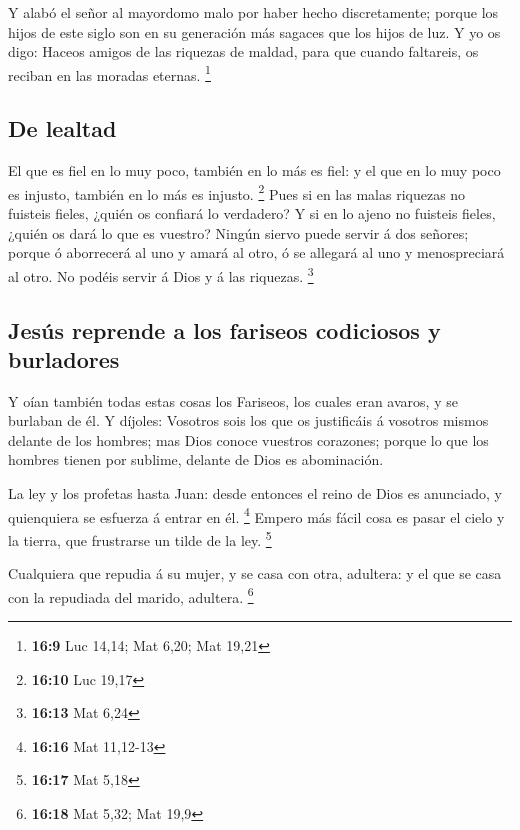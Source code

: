  Y alabó el señor al mayordomo malo por haber hecho
discretamente; porque los hijos de este siglo son en su generación más
sagaces que los hijos de luz.  Y yo os digo: Haceos amigos
de las riquezas de maldad, para que cuando faltareis, os reciban en las
moradas eternas. \footnote{\textbf{16:9} Luc 14,14; Mat 6,20; Mat 19,21}

\hypertarget{de-lealtad}{%
\subsection{De lealtad}\label{de-lealtad}}

 El que es fiel en lo muy poco, también en lo más es fiel:
y el que en lo muy poco es injusto, también en lo más es injusto.
\footnote{\textbf{16:10} Luc 19,17}  Pues si en las malas
riquezas no fuisteis fieles, ¿quién os confiará lo verdadero?
 Y si en lo ajeno no fuisteis fieles, ¿quién os dará lo que
es vuestro?  Ningún siervo puede servir á dos señores;
porque ó aborrecerá al uno y amará al otro, ó se allegará al uno y
menospreciará al otro. No podéis servir á Dios y á las riquezas.
\footnote{\textbf{16:13} Mat 6,24}

\hypertarget{jesuxfas-reprende-a-los-fariseos-codiciosos-y-burladores}{%
\subsection{Jesús reprende a los fariseos codiciosos y
burladores}\label{jesuxfas-reprende-a-los-fariseos-codiciosos-y-burladores}}

 Y oían también todas estas cosas los Fariseos, los cuales
eran avaros, y se burlaban de él.  Y díjoles: Vosotros sois
los que os justificáis á vosotros mismos delante de los hombres; mas
Dios conoce vuestros corazones; porque lo que los hombres tienen por
sublime, delante de Dios es abominación.

 La ley y los profetas hasta Juan: desde entonces el reino
de Dios es anunciado, y quienquiera se esfuerza á entrar en él.
\footnote{\textbf{16:16} Mat 11,12-13}  Empero más fácil
cosa es pasar el cielo y la tierra, que frustrarse un tilde de la ley.
\footnote{\textbf{16:17} Mat 5,18}

 Cualquiera que repudia á su mujer, y se casa con otra,
adultera: y el que se casa con la repudiada del marido, adultera.
\footnote{\textbf{16:18} Mat 5,32; Mat 19,9}

